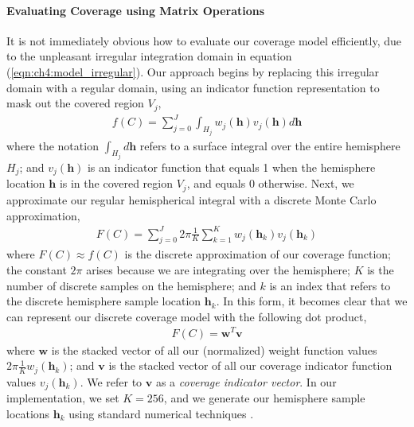 \paragraph{Evaluating Coverage using Matrix Operations}
It is not immediately obvious how to evaluate our coverage model efficiently, due to the unpleasant irregular integration domain in equation (\ref{eqn:ch4:model_irregular}).
Our approach begins by replacing this irregular domain with a regular domain, using an indicator function representation to mask out the covered region $V_j$,
%
\begin{equation}
\begin{aligned}
f(C) = \sum_{j=0}^{J} \int_{H_j} w_j(\mathbf{h}) v_{j}(\mathbf{h}) d\mathbf{h}
\end{aligned}
\end{equation}
%
where the notation $\int_{H_j} d\mathbf{h}$ refers to a surface integral over the entire hemisphere $H_j$;
and $v_j(\mathbf{h})$ is an indicator function that equals 1 when the hemisphere location $\mathbf{h}$ is in the covered region $V_j$, and equals 0 otherwise.
Next, we approximate our regular hemispherical integral with a discrete Monte Carlo approximation,
%
\begin{equation}
\begin{aligned}
F(C)= \sum_{j=0}^{J} 2\pi \frac{1}{K} \sum_{k=1}^{K} w_j(\mathbf{h}_k) v_{j}(\mathbf{h}_k)
\end{aligned}
\end{equation}
%
where
$F(C) \approx f(C)$ is the discrete approximation of our coverage function;
the constant $2 \pi$ arises because we are integrating over the hemisphere;
$K$ is the number of discrete samples on the hemisphere;
and $k$ is an index that refers to the discrete hemisphere sample location $\mathbf{h}_k$.
In this form, it becomes clear that we can represent our discrete coverage model with the following dot product,
%
\begin{equation}
\begin{aligned}
F(C) = \mathbf{w}^T \mathbf{v}
\end{aligned}
\end{equation}
%
where $\mathbf{w}$ is the stacked vector of all our (normalized) weight function values $2 \pi \frac{1}{K}w_j(\mathbf{h}_k)$;
and $\mathbf{v}$ is the stacked vector of all our coverage indicator function values $v_j(\mathbf{h}_k)$.
We refer to $\mathbf{v}$ as a \emph{coverage indicator vector}.
In our implementation, we set $K=256$, and we generate our hemisphere sample locations $\mathbf{h}_k$ using standard numerical techniques \cite{devert:2012}.


